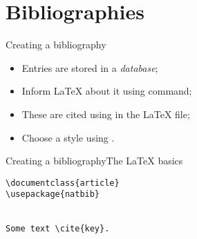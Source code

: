 
\section{Bibliographies}

\begin{frame}{Creating a bibliography}

  \begin{itemize}
    \item Entries are stored in a \emph{\BibTeX{} database};
    \item Inform \LaTeX{} about it using  command;
    \item These are cited using  in the \LaTeX{} file;
    \item Choose a style using .
  \end{itemize}
  
\end{frame}

\begin{frame}[fragile]{Creating a bibliography}{The \LaTeX{} basics}

\begin{verbatim}
\documentclass{article}
\usepackage{natbib}


Some text \cite{key}.


\end{verbatim}
  
\end{frame}

